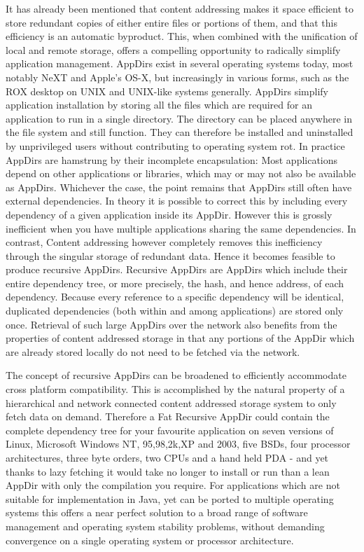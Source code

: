\documentclass[british,english]{article}
\begin{document}
It has already been mentioned that content addressing makes it space
efficient to store redundant copies of either entire files or portions
of them, and that this efficiency is an automatic byproduct. This,
when combined with the unification of local and remote storage, offers
a compelling opportunity to radically simplify application management.
AppDirs exist in several operating systems today, most notably NeXT
and Apple's OS-X, but increasingly in various forms, such as the ROX
desktop on UNIX and UNIX-like systems generally. AppDirs simplify
application installation by storing all the files which are required
for an application to run in a single directory. The directory can
be placed anywhere in the file system and still function. They can
therefore be installed and uninstalled by unprivileged users without
contributing to operating system rot. In practice AppDirs are hamstrung
by their incomplete encapsulation: Most applications depend on other
applications or libraries, which may or may not also be available
as AppDirs. Whichever the case, the point remains that AppDirs still
often have external dependencies. In theory it is possible to correct
this by including every dependency of a given application inside its
AppDir. However this is grossly inefficient when you have multiple
applications sharing the same dependencies. In contrast, Content addressing
however completely removes this inefficiency through the singular
storage of redundant data. Hence it becomes feasible to produce recursive
AppDirs. Recursive AppDirs are AppDirs which include their entire
dependency tree, or more precisely, the hash, and hence address, of
each dependency. Because every reference to a specific dependency
will be identical, duplicated dependencies (both within and among
applications) are stored only once. Retrieval of such large AppDirs
over the network also benefits from the properties of content addressed
storage in that any portions of the AppDir which are already stored
locally do not need to be fetched via the network.

The concept of recursive AppDirs can be broadened to efficiently accommodate
cross platform compatibility. This is accomplished by the natural
property of a hierarchical and network connected content addressed
storage system to only fetch data on demand. Therefore a Fat Recursive
AppDir could contain the complete dependency tree for your favourite
application on seven versions of Linux, Microsoft Windows NT, 95,98,2k,XP
and 2003, five BSDs, four processor architectures, three byte orders,
two CPUs and a hand held PDA - and yet thanks to lazy fetching it
would take no longer to install or run than a lean AppDir with only
the compilation you require. For applications which are not suitable
for implementation in Java, yet can be ported to multiple operating
systems this offers a near perfect solution to a broad range of software
management and operating system stability problems, without demanding
convergence on a single operating system or processor architecture.
\end{document}

